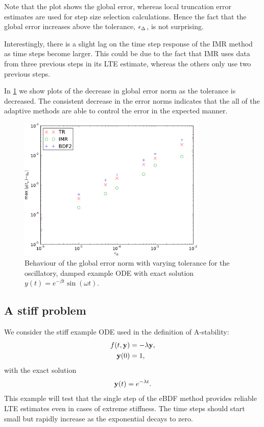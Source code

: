 Note that the plot shows the global error, whereas local truncation error estimates are used for step size selection calculations.
Hence the fact that the global error increases above the tolerance, $\epsilon_{\Delta_{}}$, is not surprising.

Interestingly, there is a slight lag on the time step response of the IMR method as time steps become larger.
This could be due to the fact that IMR uses data from three previous steps in its LTE estimate, whereas the others only use two previous steps.

In \cref{fig:imr-osc-example-scatter} we show plots of the decrease in global error norm as the tolerance is decreased.
The consistent decrease in the error norms indicates that the all of the adaptive methods are able to control the error in the expected manner.

\begin{figure}
  \centering \includegraphics[width=0.8\textwidth]{plots/aimr_odes/damped_oscillation-maxoferrornormsvs-tol}
  \caption{Behaviour of the global error norm with varying tolerance for the oscillatory, damped example ODE with exact solution $y(t) = e^{-\beta t} \sin(\omega t)$.}
  \label{fig:imr-osc-example-scatter}
\end{figure}

\subsection{A stiff problem}
\label{sec:imr-stiff-example}

We consider the stiff example ODE used in the definition of A-stability:
\begin{equation}
  \label{eqn:imr-test-stiff}
  \begin{aligned}
    f(t, \boldsymbol{\mathrm{y}}) &= -\lambda \boldsymbol{\mathrm{y}}, \\
    \boldsymbol{\mathrm{y}}(0) &= 1,
  \end{aligned}
\end{equation}
with the exact solution
\begin{equation}
  \label{eqn:imr-test-stiff-exact}
  \boldsymbol{\mathrm{y}}(t) = e^{-\lambda t}.
\end{equation}
This example will test that the single step of the eBDF method provides reliable LTE estimates even in cases of extreme stiffness.
The time steps should start small but rapidly increase as the exponential decays to zero.

